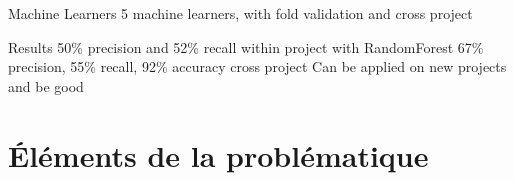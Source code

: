 Machine Learners
	5 machine learners, with fold validation and cross project
	
Results
	50\% precision and 52\% recall within project with RandomForest
	67\% precision, 55\% recall, 92\% accuracy cross project
	Can be applied on new projects and be good
		






\section{Éléments de la problématique}  

